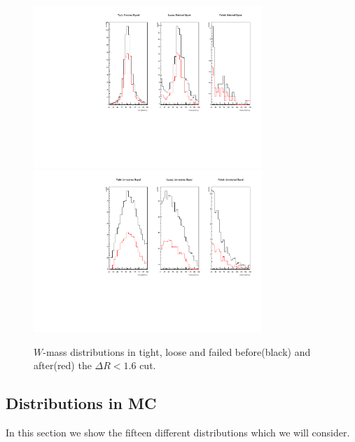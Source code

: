 \begin{figure}[ht!]
\centering
        \includegraphics[width=0.77\textwidth]{figs/WtagSF/sigproof.pdf}
        \includegraphics[width=0.77\textwidth]{figs/WtagSF/sigproofII.pdf}
    \caption{$W$-mass distributions in tight, loose and failed before(black) and after(red) the $\Delta R < 1.6$ cut.}\label{fig:drproof}
\end{figure}
\subsection{Distributions in MC}
In this section we show the fifteen different distributions which we will consider.
